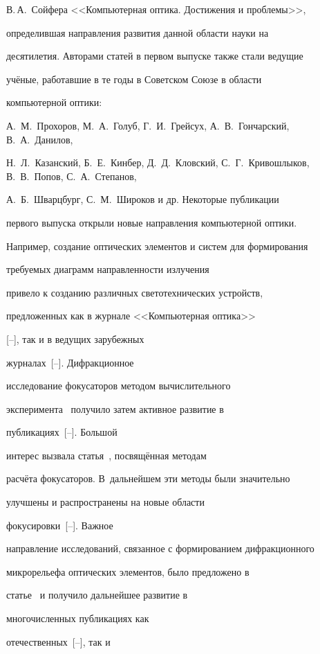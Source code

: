 В.\,А.~Сойфера <<Компьютерная оптика. Достижения и проблемы>>,

определившая направления развития данной области науки на

десятилетия. Авторами статей в первом выпуске также стали ведущие

учёные, работавшие в те годы в Советском Союзе в области

компьютерной оптики: 

А.~М.~Прохоров, М.~А.~Голуб, Г.~И.~Грейсух, А.~В.~Гончарский, В.~А.~Данилов,

Н.~Л.~Казанский, Б.~Е.~Кинбер, Д.~Д.~Кловский, С.~Г.~Кривошлыков, В.~В.~Попов, С.~А.~Степанов,

А.~Б.~Шварцбург, С.~М.~Широков и др. Некоторые публикации

первого выпуска открыли новые направления компьютерной оптики.

Например, создание оптических элементов и систем для формирования

требуемых диаграмм направленности излучения~\cite{kol:bib30}

привело к созданию различных светотехнических устройств,

предложенных как в журнале <<Компьютерная оптика>>

[--], так и в ведущих зарубежных

журналах~[--]. Дифракционное

исследование фокусаторов методом вычислительного

эксперимента~\cite{kol:bib39} получило затем активное развитие в

публикациях~[--]. Большой

интерес вызвала статья~\cite{kol:bib48}, посвящённая методам

расчёта фокусаторов. В~дальнейшем эти методы были значительно

улучшены и распространены на новые области

фокусировки~[--]. Важное

направление исследований, связанное с формированием дифракционного

микрорельефа оптических элементов, было предложено в

статье~\cite{kol:bib54} и получило дальнейшее развитие в

многочисленных публикациях как 

отечественных~[--], так и 

